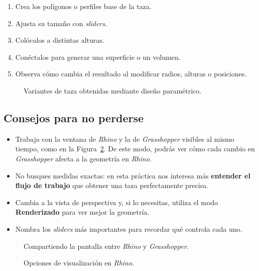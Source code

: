 \documentclass[
  spanish,
  11pt,
  a4paper,
  DIV=11,
  numbers=noendperiod]{scrartcl}
\providecommand{\tightlist}{\setlength{\itemsep}{0pt}\setlength{\parskip}{0pt}}
\begin{document}
\begin{enumerate}
\tightlist
\item Crea los polígonos o perfiles base de la taza.
\item Ajusta su tamaño con \emph{sliders}.
\item Colócalos a distintas alturas.
\item Conéctalos para generar una superficie o un volumen.
\item Observa cómo cambia el resultado al modificar radios, alturas o posiciones.
\end{enumerate}

\begin{figure}[H]
\caption{Variantes de taza obtenidas mediante diseño paramétrico.}\label{fig-teacups}
\end{figure}

\subsection{Consejos para no perderse}
\label{consejos-para-no-perderse}

\begin{itemize}
\tightlist
\item Trabaja con la ventana de \emph{Rhino} y la de \emph{Grasshopper} visibles al mismo tiempo, como en la Figura~\ref{fig-split-screen}. De este modo, podrás ver cómo cada cambio en \emph{Grasshopper} afecta a la geometría en \emph{Rhino}.
\item No busques medidas exactas: en esta práctica nos interesa más \textbf{entender el flujo de trabajo} que obtener una taza perfectamente precisa.
\item Cambia a la vista de perspectiva y, si lo necesitas, utiliza el modo \textbf{Renderizado} para ver mejor la geometría.
\item Nombra los \emph{sliders} más importantes para recordar qué controla cada uno.
\end{itemize}

\begin{figure}[H]
\caption{Compartiendo la pantalla entre \emph{Rhino} y \emph{Grasshopper}.}\label{fig-split-screen}
\end{figure}

\begin{figure}[H]
\caption{Opciones de visualización en \emph{Rhino}.}\label{fig-maximizar-renderizado}
\end{figure}
\end{document}
